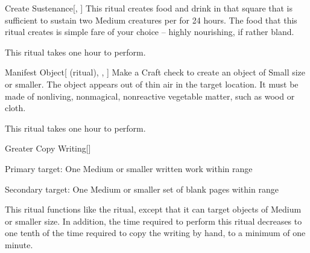 \lowercase{\hypertarget{spell:Create Sustenance}{}}\label{spell:Create Sustenance}
\begin{apability}[Rank 3]{\hypertarget{spell:Create Sustenance}{Create Sustenance}}[, ]
This ritual creates food and drink in that square that is sufficient to sustain two Medium creatures per  for 24 hours.
The food that this ritual creates is simple fare of your choice -- highly nourishing, if rather bland.

This ritual takes one hour to perform.
\end{apability}
\vspace{0.25em}



\lowercase{\hypertarget{spell:Manifest Object}{}}\label{spell:Manifest Object}
\begin{attuneability}[Rank 3]{\hypertarget{spell:Manifest Object}{Manifest Object}}[ (ritual), , ]
Make a Craft check to create an object of Small size or smaller.
The object appears out of thin air in the target location.
It must be made of nonliving, nonmagical, nonreactive vegetable matter, such as wood or cloth.

This ritual takes one hour to perform.
\end{attuneability}
\vspace{0.25em}



\lowercase{\hypertarget{spell:Greater Copy Writing}{}}\label{spell:Greater Copy Writing}
\begin{freeability}[Rank 4]{\hypertarget{spell:Greater Copy Writing}{Greater Copy Writing}}[]

Primary target: One Medium or smaller written work within \rngclose range
\par\noindent
Secondary target: One Medium or smaller set of blank pages within \rngclose range

This ritual functions like the  ritual, except that it can target objects of Medium or smaller size.
In addition, the time required to perform this ritual decreases to one tenth of the time required to copy the writing by hand, to a minimum of one minute.
\end{freeability}
\vspace{0.25em}


